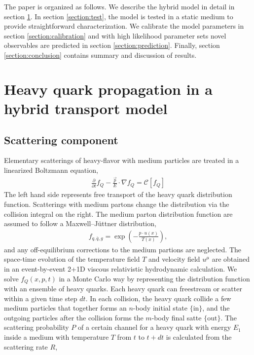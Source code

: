 \documentclass[aps, prc, reprint, amsmath, groupedaddress, nofootinbib]{revtex4-1}
\begin{document}
The paper is organized as follows. We describe the hybrid model in detail in section \ref{section:model}. In section \ref{section:test}, the model is tested in a static medium to provide straightforward characterization. We calibrate the model parameters in section \ref{section:calibration} and with high likelihood parameter sets novel observables are predicted in section \ref{section:prediction}. Finally, section \ref{section:conclusion} contains summary and discussion of results.

\section{Heavy quark propagation in a hybrid transport model}\label{section:model}
\subsection{Scattering component}
Elementary scatterings of heavy-flavor with medium particles are treated in a linearized Boltzmann equation,
\begin{eqnarray}
  \frac{\partial}{\partial t}f_Q - \frac{\vec{p}}{E}\cdot\nabla f_Q  = 
\mathcal{C}[f_Q]
\end{eqnarray}
The left hand side represents free transport of the heavy quark distribution function. 
Scatterings with medium partons change the distribution via the collision integral on the right.
The medium parton distribution function are assumed to follow a Maxwell--J\"uttner distribution, 
\begin{eqnarray}
f_{q,\bar{q}, g} = \exp\left(-\frac{p \cdot u(x)}{T(x)}\right),
\end{eqnarray}
and any off-equilibrium corrections to the medium partions are neglected.
The space-time evolution of the temperature field $T$ and velocity field $u^\mu$ are obtained in an event-by-event 2+1D viscous relativistic hydrodynamic calculation.
We solve $f_Q(x, p, t)$ in a Monte Carlo way by representing the distribution function with an ensemble of heavy quarks.
Each heavy quark can freestream or scatter within a given time step $dt$.
In each collision, the heavy quark collide a few medium particles that together forms an $n$-body initial state $\{\textrm{in}\}$, and the outgoing particles after the collision forms the $m$-body final satte $\{\textrm{out}\}$.
The scattering probability $P$ of a certain channel for a heavy quark with energy $E_1$ inside a medium with temperature $T$ from $t$ to $t+dt$ is calculated from the scattering rate $R$,
\end{document}
